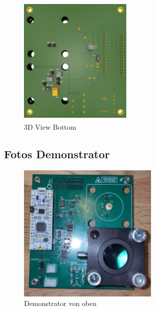 \begin{figure}[H]
    \centering
    \includegraphics[width=0.5\textwidth]{graphics/3d_bottom.png}
    \caption{3D View Bottom}\label{fig:apdx_3d_bottom}
\end{figure}

\subsection{Fotos Demonstrator}\label{sec:apdx_photos_demonstrator}

\begin{figure}[H]
    \centering
    \includegraphics[width=0.6\textwidth]{graphics/photo_demonstrator_top.jpg}
    \caption{Demonstrator von oben}\label{fig:apdx_photo_demonstrator_top}
\end{figure}

